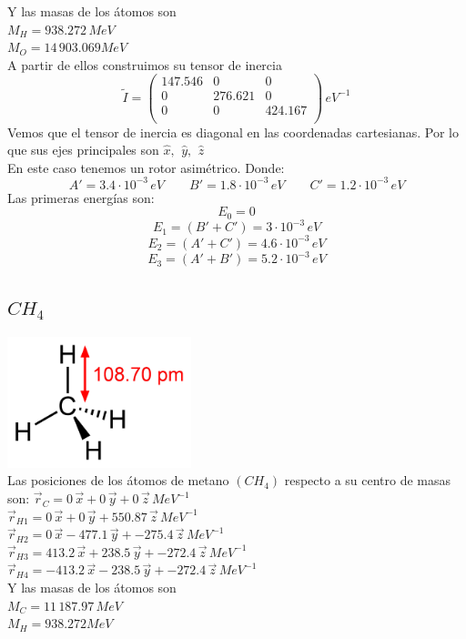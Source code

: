 \documentclass[a4paper]{article}
\begin{document}
 Y las masas de los átomos son\\
 $M_H = 938.272 \, MeV$\\
 $M_O = 14\, 903.069 MeV$\\
 
 A partir de ellos construimos su tensor de inercia
 $$ \tilde I =
 \begin{pmatrix}
 147.546 & 0 & 0 \\
 0 & 276.621 & 0 \\
 0 & 0 & 424.167\\
 \end{pmatrix}
 \, eV^{-1}
 $$
 Vemos que el tensor de inercia es diagonal en las coordenadas cartesianas. Por lo que sus ejes principales son $ \hat x, \,\ \hat y, \,\ \hat z$\\
 En este caso tenemos un rotor asimétrico. Donde:
 $$A'= 3.4 \cdot 10^{-3}\, eV \qquad B' = 1.8 \cdot 10^{-3}\, eV \qquad C' = 1.2 \cdot 10^{-3}\, eV$$
 Las primeras energías son:
 $$E_0 = 0$$
 $$E_1 = (B'+C') = 3 \cdot 10^{-3}\, eV $$
 $$E_2 = (A'+C') = 4.6 \cdot 10^{-3}\, eV$$
 $$E_3 = (A'+B') = 5.2 \cdot 10^{-3}\, eV$$ 
 \subsection{$CH_4$}
 \includegraphics[width=0.4\textwidth]{metano.png}\\
Las posiciones de los átomos  de metano $(CH_4)$ respecto a su centro de masas son:
 $\vec r_C = 0\, \vec x + 0 \, \vec y + 0 \, \vec z \, MeV^{-1}$\\
 $\vec r_{H1} = 0\, \vec x+0 \, \vec y + 550.87 \, \vec z \, MeV^{-1}$\\
 $\vec r_{H2} = 0\, \vec x -477.1 \, \vec y + -275.4\, \vec z \, MeV^{-1}$\\
 $\vec r_{H3} = 413.2\, \vec x + 238.5 \, \vec y + -272.4 \, \vec z \, MeV^{-1}$\\
 $\vec r_{H4} = -413.2 \, \vec x -238.5 \, \vec y + -272.4 \, \vec z \, MeV^{-1}$\\
 
 Y las masas de los átomos son\\
 $M_C = 11\, 187.97 \, MeV$\\
 $M_H = 938.272 MeV$\\
 
\end{document}
